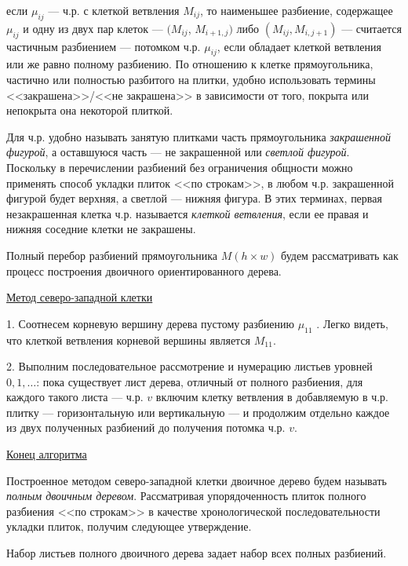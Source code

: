 если $\mu_{ij}$ --- ч.р. с клеткой ветвления $M_{ij}$, то наименьшее разбиение, содержащее $\mu_{ij}$ и одну из двух пар клеток --- $(M_{ij}$, $M_{i+1,j})$ либо $(M_{ij}, M_{i,j+1})$ --- считается частичным разбиением --- потомком ч.р. $\mu_{ij}$, если обладает клеткой ветвления или же равно полному разбиению.
По отношению к клетке прямоугольника, частично или полностью разбитого на плитки, удобно использовать термины <<закрашена>>/<<не закрашена>> в зависимости от того, покрыта или непокрыта она некоторой плиткой.

Для ч.р. удобно называть занятую плитками часть прямоугольника \textit{ закрашенной фигурой}, а оставшуюся часть --- не закрашенной или \textit{ светлой фигурой}. Поскольку в перечислении разбиений без ограничения общности можно применять способ укладки плиток <<по строкам>>, в любом ч.р. закрашенной фигурой будет верхняя, а светлой --- нижняя фигура. В этих терминах, первая незакрашенная клетка ч.р. называется \textit{ клеткой ветвления}, если ее правая и нижняя соседние клетки не закрашены.

Полный перебор разбиений прямоугольника $M(h\times w)$ будем рассматривать как процесс построения двоичного ориентированного дерева.
\par\smallskip
\underline{Метод северо-западной клетки}

1. Соотнесем корневую вершину дерева пустому разбиению $\mu_{11}$ . Легко видеть, что клеткой ветвления корневой вершины является $M_{11}$.

2. Выполним последовательное рассмотрение и нумерацию листьев уровней \linebreak $0,1,\dots$: пока существует лист дерева, отличный от полного разбиения, для каждого такого листа --- ч.р. $v$ включим клетку ветвления в добавляемую в ч.р. плитку --- горизонтальную или вертикальную --- и продолжим отдельно каждое из двух полученных разбиений до получения потомка ч.р. $v$.

\underline{Конец алгоритма}
\par\smallskip
Построенное методом северо-западной клетки двоичное дерево будем называть \textit{  полным двоичным деревом}. Рассматривая упорядоченность плиток полного разбиения <<по строкам>> в качестве хронологической последовательности укладки плиток, получим следующее утверждение.

\begin{statement}  \label{akm1the2}
Набор листьев полного двоичного дерева задает набор всех полных разбиений.
\end{statement}


